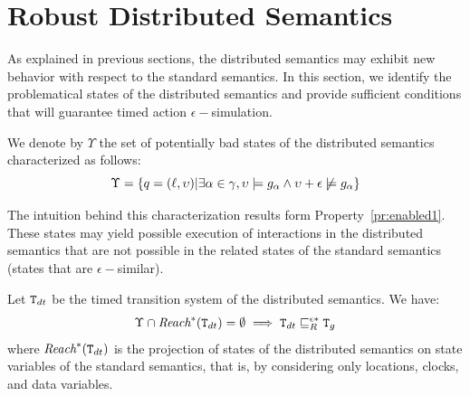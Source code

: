 \section{Robust Distributed Semantics}
As explained in previous sections, the distributed semantics may 
exhibit new behavior with respect to the standard semantics.  
In this section, we identify the problematical states of the 
distributed semantics and provide sufficient conditions
that will guarantee timed action $\epsilon-$simulation. 

\begin{definition}\label{def:pbss}
  We denote by $\Upsilon$ the set of potentially bad states of the 
  distributed semantics characterized as follows:
  \[\Upsilon=\{q=(\ell,\upsilon)|\exists\alpha\in\gamma,\upsilon\models g_{\alpha}\wedge
  \upsilon+\epsilon\not\models g_{\alpha} \} \]
\end{definition}

The intuition behind this characterization results form Property~\ref{pr:enabled1}.
These states may yield possible execution of interactions in the distributed semantics that
are not possible in the related states of the standard semantics (states that are 
$\epsilon-$similar). 

\begin{proposition}\label{prop:esim}
  Let $\texttt{T}_{dt}$ be the timed transition system of the distributed semantics. 
  We have: 
  \[\Upsilon\cap\textit{Reach}^*(\texttt{T}_{dt})=\emptyset\implies\texttt{T}_{dt}\sqsubseteq^{\epsilon*}_{R}
  \texttt{T}_{g}\]
  where $\textit{Reach}^*(\texttt{T}_{dt})$ is the projection of states of the distributed semantics 
  on state variables of the standard semantics, that is, by considering only locations, clocks,
  and data variables.
\end{proposition}

